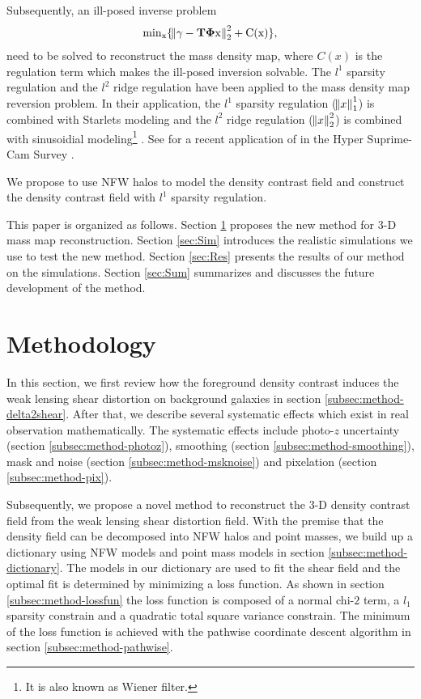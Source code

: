 \documentclass[twocolumn]{aastex62}
\begin{document}
Subsequently, an ill-posed inverse problem
\begin{equation}
\rm{min}_x\{\norm{\gamma - \mathbf{T\Phi} x}_2^2+ C(x)\},
\end{equation}
need to be solved to reconstruct the mass density map, where $C(x)$ is the regulation term which makes the ill-posed 
inversion solvable. The $l^1$ sparsity regulation and the $l^2$ ridge regulation have been applied to the mass density 
map reversion problem. In their application, the $l^1$ sparsity regulation ($\norm{x}^1_1$) is combined with Starlets modeling 
\citep{LSS-massMap-Glimpse3D-Leonard2014} and the $l^2$ ridge regulation ($\norm{x}^2_2$) is combined with sinusoidial modeling\footnote{It 
is also known as Wiener filter.} \citep{LSS-massMap-Wiener-Simon2009}. See \citet{HSC1-massMaps} for a recent application 
of \citet{LSS-massMap-Wiener-Simon2009} in the Hyper Suprime-Cam Survey \citep{HSC1-data}.

We propose to use NFW halos \citep{halo-NFW1997ApJ} to model the density contrast field and construct the density contrast 
field with $l^1$ sparsity regulation.


This paper is organized as follows.
Section \ref{sec:Method} proposes the new method for $3$-D mass map reconstruction.
Section \ref{sec:Sim} introduces the realistic simulations we use to test the new method.
Section \ref{sec:Res} presents the results of our method on the simulations.
Section \ref{sec:Sum} summarizes and discusses the future development of the method.

\section{Methodology}
\label{sec:Method}

In this section, we first review how the foreground density contrast induces the weak lensing shear distortion on background 
galaxies in section \ref{subsec:method-delta2shear}.
After that, we describe several systematic effects which exist in real observation mathematically. The systematic effects 
include photo-$z$ uncertainty (section \ref{subsec:method-photoz}), smoothing (section \ref{subsec:method-smoothing}),
mask and noise (section \ref{subsec:method-msknoise}) and pixelation (section \ref{subsec:method-pix}).

Subsequently, we propose a novel method to reconstruct the $3$-D density contrast field from the weak lensing shear 
distortion field. 
With the premise that the density field can be decomposed into NFW halos and point masses, we build up a dictionary using 
NFW models and point mass models in section \ref{subsec:method-dictionary}.
The models in our dictionary are used to fit the shear field and the optimal fit is determined by minimizing a loss function. 
As shown in section \ref{subsec:method-lossfun} the loss function is composed of a normal chi-$2$ term, a $l_1$ sparsity 
constrain and a quadratic total square variance constrain.
The minimum of the loss function is achieved with the pathwise coordinate descent algorithm in section \ref{subsec:method-pathwise}.
\end{document}
